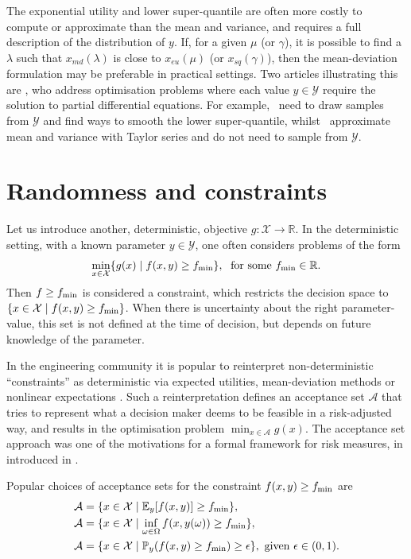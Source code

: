 \documentclass[main.tex]{subfiles}
\begin{document}
The exponential utility and lower super-quantile are often more costly
to compute or approximate than the mean and variance, and requires a
full description of the distribution of $y$. If, for a given $\mu$ (or
$\gamma$), it is possible to find a $\lambda$ such that
$x_{md}(\lambda)$ is close to $x_{eu}(\mu)$ (or $x_{sq}(\gamma)$), then the
mean-deviation formulation may be preferable in practical settings.
Two articles illustrating this are
\citep{kouri2016risk,alexanderian2017mean}, who address optimisation problems
where each value $y\in\mathcal{Y}$ require the solution to partial
differential equations.
For example,~\cite{kouri2016risk}
need to draw samples from $\mathcal{Y}$ and find ways to smooth the lower super-quantile,
whilst~\cite{alexanderian2017mean} approximate mean and variance
with Taylor series and do not need to sample from $\mathcal{Y}$.


\section{Randomness and constraints}
Let us introduce another, deterministic, objective $g:\mathcal
X\to\mathbb{R}$. In the deterministic setting, with a known parameter
$y\in\mathcal{Y}$, one often considers problems of the form
\begin{align}
  \min_{x\in\mathcal{X}}\{g(x)\mid f(x,y)\geq f_{\textnormal{min}} \},\;
  \text{ for some } f_{\textnormal{min}}\in\mathbb{R}.
\end{align}
Then $f\geq f_{\textnormal{min}}$ is considered a constraint, which restricts the
decision space to $\{x\in\mathcal{X}\mid f(x,y)\geq f_{\textnormal{min}}\}$.
When there is uncertainty about the right parameter-value, this set is
not defined at the time of decision, but depends on future knowledge
of the parameter.

In the engineering community it is popular to
reinterpret non-deterministic ``constraints'' as deterministic via
expected utilities, mean-deviation methods or nonlinear
expectations
\citep{rockafellar2007coherent,rockafellar2015engineering}.
Such a reinterpretation defines an acceptance set $\mathcal{A}$ that
tries to represent what a decision maker deems to be feasible in a
risk-adjusted way, and results in the optimisation problem
$\min_{x\in\mathcal{A}} g(x)$.
The acceptance set approach was one of the motivations for a formal
framework for risk measures, in introduced in \citep{artzner1999coherent}.
\begin{example}
  Popular choices of acceptance sets for the constraint $f(x,y)\geq
  f_{\textnormal{min}}$ are
  \begin{align}
    \mathcal{A}&=\{x\in\mathcal{X} \mid
                 \mathbb{E}_y[f(x,y)]\geq f_{\textnormal{min}}\}, \\
    \mathcal{A}&=\{x\in\mathcal{X} \mid
                 \inf_{\omega\in\Omega}f(x,y(\omega))\geq f_{\textnormal{min}}\},\\
    \mathcal{A} &= \{x\in\mathcal{X}\mid
                  \mathbb{P}_y(f(x,y)\geq f_{\textnormal{min}})\geq \epsilon\},
                  \text{ given }\epsilon\in(0,1).
  \end{align}
\end{example}
\end{document}
